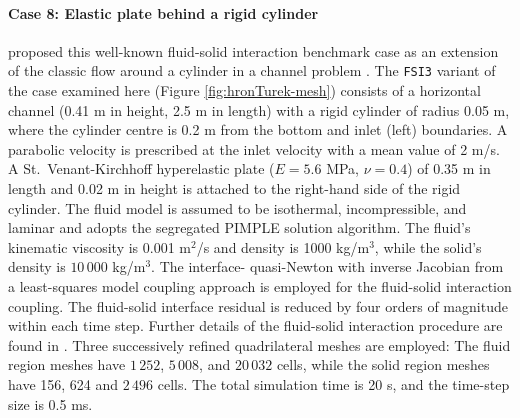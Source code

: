 \documentclass[sn-mathphys,Numbered]{sn-jnl}%
\begin{document}
\paragraph{Case 8: Elastic plate behind a rigid cylinder}
\citet{Turek2006} proposed this well-known fluid-solid interaction benchmark case as an extension of the classic flow around a cylinder in a channel problem \cite{Ferziger2002}.
The \texttt{FSI3} variant of the case examined here (Figure \ref{fig:hronTurek-mesh}) consists of a horizontal channel (0.41 m in height, 2.5 m in length) with a rigid cylinder of radius 0.05 m, where the cylinder centre is 0.2 m from the bottom and inlet (left) boundaries.
A parabolic velocity is prescribed at the inlet velocity with a mean value of 2 m/s.
A St.\ Venant-Kirchhoff hyperelastic plate ($E = 5.6$ MPa, $\nu = 0.4$) of 0.35 m in length and 0.02 m in height is attached to the right-hand side of the rigid cylinder.
The fluid model is assumed to be isothermal, incompressible, and laminar and adopts the segregated PIMPLE solution algorithm.
The fluid's kinematic viscosity is 0.001 m$^2$/s and density is 1000 kg/m$^3$, while the solid's density is $10\,000$ kg/m$^3$.
The interface- quasi-Newton with inverse Jacobian from a least-squares model coupling approach \cite{Degroote2009} is employed for the fluid-solid interaction coupling.
The fluid-solid interface residual is reduced by four orders of magnitude within each time step.
Further details of the fluid-solid interaction procedure are found in \citet{Tukovic2018a}.
Three successively refined quadrilateral meshes are employed:
The fluid region meshes have $1\,252$, $5\,008$, and $20\,032$ cells, while the solid region meshes have 156,  624 and $2\,496$ cells.
The total simulation time is 20 s, and the time-step size is 0.5 ms. 
\end{document}
